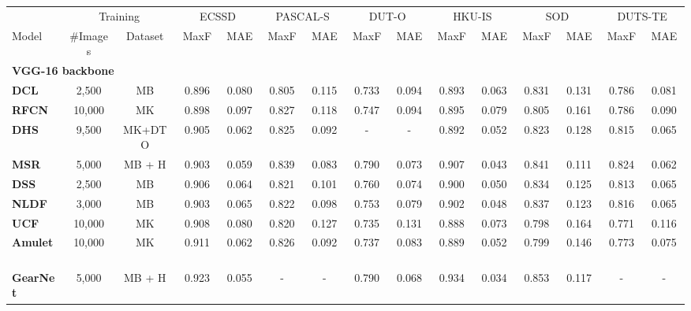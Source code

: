 \documentclass[10pt,twocolumn,letterpaper]{article}
\begin{document}
\begin{table*}[tp!]
  \centering
\footnotesize
  \renewcommand{\arraystretch}{1.1}
  \renewcommand{\tabcolsep}{1.0mm}
  \begin{tabular}{lcccccccccccccc}
  \toprule[1pt]
   & \multicolumn{2}{c}{Training} & \multicolumn{2}{c}{ECSSD \cite{yan2013hierarchical}} & \multicolumn{2}{c}{PASCAL-S \cite{li2014secrets}} & \multicolumn{2}{c}{DUT-O \cite{yang2013saliency}} & \multicolumn{2}{c}{HKU-IS \cite{li2015visual}} & \multicolumn{2}{c}{SOD \cite{movahedi2010design}} & \multicolumn{2}{c}{DUTS-TE \cite{wang2017learning}} \\
   \cmidrule(l){2-3} \cmidrule(l){4-5} \cmidrule(l){6-7} \cmidrule(l){8-9} \cmidrule(l){10-11} \cmidrule(l){12-13} \cmidrule(l){14-15}
   Model & \#Images & Dataset & MaxF~ & MAE~ & MaxF~ & MAE~ & MaxF~ & MAE~ & MaxF~ & MAE~ & MaxF~ & MAE~ & MaxF~ & MAE~ \\
  \midrule[1pt]
  \multicolumn{15}{l}{\textbf{VGG-16 backbone}} \\ \midrule[1pt]
  \textbf{DCL}~\cite{li2016deep} & 2,500 & MB & 0.896 & 0.080 & 0.805 & 0.115 & 0.733 & 0.094 & 0.893 & 0.063 & 0.831 & 0.131 & 0.786 & 0.081 \\
  \textbf{RFCN}~\cite{wangsaliency} & 10,000 & MK & 0.898 & 0.097 & 0.827 & 0.118 & 0.747 & 0.094 & 0.895 & 0.079 & 0.805 & 0.161 & 0.786 & 0.090 \\
  \textbf{DHS}~\cite{liu2016dhsnet} & 9,500 & MK+DTO & 0.905 & 0.062& 0.825 & 0.092 & - & - & 0.892 & 0.052 & 0.823 & 0.128 & 0.815 & 0.065 \\
\textbf{MSR}~\cite{li2017instance} & 5,000 & MB + H & 0.903 & 0.059 & 0.839 & 0.083 & 0.790 & 0.073 & 0.907 & 0.043 & 0.841 & 0.111 & 0.824 & 0.062 \\
  \textbf{DSS}~\cite{hou2016deeply} & 2,500 & MB & 0.906 & 0.064 & 0.821 & 0.101 & 0.760 & 0.074 & 0.900 & 0.050 & 0.834 & 0.125 & 0.813 & 0.065 \\
  \textbf{NLDF}~\cite{luo2017non} & 3,000 & MB & 0.903 & 0.065 & 0.822 & 0.098 & 0.753 & 0.079 & 0.902 & 0.048 & 0.837 & 0.123 & 0.816 & 0.065 \\
  \textbf{UCF}~\cite{zhang2017learning} & 10,000 & MK & 0.908 & 0.080 & 0.820 & 0.127 & 0.735 & 0.131 & 0.888 & 0.073 & 0.798 & 0.164 & 0.771 & 0.116 \\
  \textbf{Amulet}~\cite{zhang2017amulet} & 10,000 & MK & 0.911 & 0.062 & 0.826 & 0.092 & 0.737 & 0.083 & 0.889 & 0.052 & 0.799 & 0.146 & 0.773 & 0.075 \\
  \textbf{GearNet}\cite{hou2018three} & 5,000 & MB + H & 0.923 & 0.055 & - & - & 0.790 & 0.068 & 0.934 & 0.034 & 0.853 & 0.117 & - & - \\

\end{tabular}
\end{table*}
\end{document}
